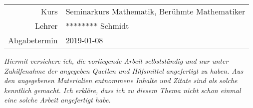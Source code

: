 \documentclass{article}
\begin{document}

\maketitle

\vspace{1cm}

\begin{center}
    \begin{tabular}{r|l}
        Kurs         & Seminarkurs Mathematik, Berühmte Mathematiker \\
        Lehrer       & ******** Schmidt                              \\
        Abgabetermin & 2019-01-08                                    \\
    \end{tabular}
\end{center}

\newpage


\tableofcontents
\newpage


\textit{Hiermit versichere ich, die vorliegende Arbeit selbstständig und nur unter Zuhilfenahme der angegeben Quellen und Hilfsmittel angefertigt zu haben. Aus den angegebenen Materialien entnommene Inhalte und Zitate sind als solche kenntlich gemacht. Ich erkläre, dass ich zu diesem Thema nicht schon einmal eine solche Arbeit angefertigt habe.}






\newpage


\label{sec:glossary}
\printglossary
\label{sec:symb}
\printnomenclature
\newpage

\printbibliography[heading=bibintoc]
\end{document}

